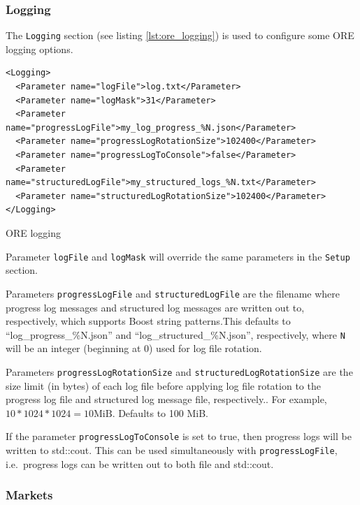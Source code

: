 \documentclass[12pt, a4paper]{article}
\begin{document}
\subsubsection{Logging}\label{sec:master_input_logging}

The {\tt Logging} section (see listing \ref{lst:ore_logging}) is used to configure some ORE logging options.

\begin{listing}[H]
\begin{verbatim}
<Logging>
  <Parameter name="logFile">log.txt</Parameter>
  <Parameter name="logMask">31</Parameter>
  <Parameter name="progressLogFile">my_log_progress_%N.json</Parameter>
  <Parameter name="progressLogRotationSize">102400</Parameter>
  <Parameter name="progressLogToConsole">false</Parameter>
  <Parameter name="structuredLogFile">my_structured_logs_%N.txt</Parameter>
  <Parameter name="structuredLogRotationSize">102400</Parameter>
</Logging>
\end{verbatim}
\caption{ORE logging}
\label{lst:ore_logging}
\end{listing}

Parameter {\tt logFile} and {\tt logMask} will override the same parameters in the {\tt Setup} section.

Parameters {\tt progressLogFile} and {\tt structuredLogFile} are the filename where progress log messages
and structured log messages are written out to, respectively, which supports Boost string patterns.This defaults to ``log\_progress\_\%N.json'' and ``log\_structured\_\%N.json'', respectively, where {\tt N} will be an integer (beginning at 0) used for log file rotation.

Parameters {\tt progressLogRotationSize} and {\tt structuredLogRotationSize} are the size limit (in bytes)
of each log file before applying log file rotation to the progress log file and structured log message file,
respectively.. For example, $10 * 1024 * 1024 = 10 \text{MiB}$. Defaults to 100 MiB.

If the parameter {\tt progressLogToConsole} is set to true, then progress logs will be written to std::cout.
This can be used simultaneously with {\tt progressLogFile}, i.e.\ progress logs can be written out
to both file and std::cout.

\subsubsection{Markets}\label{sec:master_input_markets}
\end{document}
